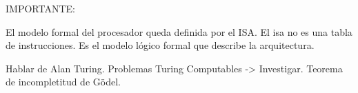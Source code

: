 IMPORTANTE:

El modelo formal del procesador queda definida por el ISA. El isa no es una tabla de instrucciones. Es el modelo lógico formal que describe la arquitectura.

Hablar de Alan Turing. Problemas Turing Computables -> Investigar. Teorema de incompletitud de Gödel.	



% 
% 
% 
% 
% 
